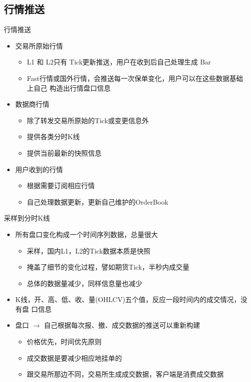 \subsection{行情推送}

\begin{frame}{行情推送}
  \begin{itemize}
  \item 交易所原始行情
    \begin{itemize}
    \item L1 和 L2只有 Tick更新推送，用户在收到后自己处理生成 Bar
    \item Fast行情或国外行情，会推送每一次保单变化，用户可以在这些数据基础上自己
      构造出行情盘口信息 
    \end{itemize}
  \item 数据商行情
    \begin{itemize}
    \item 除了转发交易所原始的Tick或变更信息外
    \item 提供各类分时K线
    \item 提供当前最新的快照信息
    \end{itemize}
  \item 用户收到的行情
    \begin{itemize}
    \item 根据需要订阅相应行情
    \item 自己处理数据更新，更新自己维护的OrderBook
    \end{itemize}
    \end{itemize}
\end{frame}

\begin{frame}{采样到分时K线}
  \begin{itemize}
  \item 所有盘口变化构成一个时间序列数据，总量很大
    \begin{itemize}
    \item 采样，国内L1，L2的Tick数据本质是快照
    \item 掩盖了细节的变化过程，譬如期货Tick，半秒内成交量
    \item 总体的数据量减少，同样信息量也减少
    \end{itemize}
  \item K线，开、高、低、收、量(OHLCV)五个值，反应一段时间内的成交情况，没有盘
    口信息
  \item 盘口 $\rightarrow$ 自己根据每次报、撤、成交数据的推送可以重新构建
    \begin{itemize}
    \item 价格优先，时间优先原则
    \item 成交数据是要减少相应地挂单的
    \item 跟交易所那边不同，交易所生成成交数据，客户端是消费成交数据
    \end{itemize}
  \end{itemize}
\end{frame}

